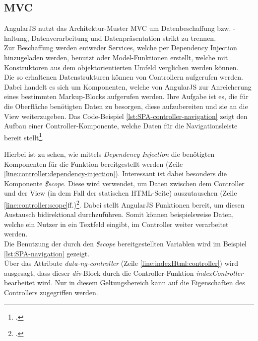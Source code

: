 \subsection{MVC}
\label{ssec:SPA-MVC}
AngularJS nutzt das Architektur-Muster \ac{MVC} um Datenbeschaffung bzw. -haltung, Datenverarbeitung und Datenpräsentation strikt zu trennen. \\ 
Zur Beschaffung werden entweder Services, welche per Dependency Injection hinzugeladen werden, benutzt oder Model-Funktionen erstellt, welche mit Konstruktoren aus dem objektorientierten Umfeld verglichen werden können. \\
Die so erhaltenen Datenstrukturen können von Controllern aufgerufen werden. Dabei handelt es sich um Komponenten, welche von AngularJS zur Anreicherung eines bestimmten Markup-Blocks aufgerufen werden. Ihre Aufgabe ist es, die für die Oberfläche benötigten Daten zu besorgen, diese aufzubereiten und sie an die View weiterzugeben. Das Code-Beispiel \ref{lst:SPA-controller-navigation} zeigt den Aufbau einer Controller-Komponente, welche Daten für die Navigationsleiste bereit stellt\footcite{online:angular:controller}.

Hierbei ist zu sehen, wie mittels \textit{Dependency Injection} die benötigten Komponenten für die Funktion bereitgestellt werden (Zeile \ref{line:controller:dependency-injection}). Interessant ist dabei besonders die Komponente \textit{\$scope}. Diese wird verwendet, um Daten zwischen dem Controller und der View (in dem Fall der statischen HTML-Seite) auszutauschen (Zeile \ref{line:controller:scope}ff.)\footcite{online:angular:scopes}. Dabei stellt AngularJS Funktionen bereit, um diesen Austausch bidirektional durchzuführen. Somit können beispielsweise Daten, welche ein Nutzer in ein Textfeld eingibt, im Controller weiter verarbeitet werden.\\
Die Benutzung der durch den \textit{\$scope} bereitgestellten Variablen wird im Beispiel \ref{lst:SPA-navigation} gezeigt.\\

Über das Attribute \textit{data-ng-controller} (Zeile \ref{line:indexHtml:controller}) wird ausgesagt, dass dieser \textit{div}-Block durch die Controller-Funktion \textit{indexController} bearbeitet wird. Nur in diesem Geltungsbereich kann auf die Eigenschaften des Controllers zugegriffen werden. \\
